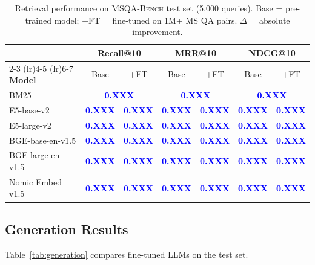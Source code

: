 \documentclass[11pt]{article}
\newcommand{\msqa}{\textsc{MSQA-Bench}}
\newcommand{\placeholder}[1]{\textcolor{blue}{\textbf{#1}}}
\begin{document}
\begin{table}[t]
\centering
\caption{Retrieval performance on \msqa{} test set (5,000 queries). Base =
pre-trained model; +FT = fine-tuned on 1M+ MS QA pairs.
$\Delta$ = absolute improvement.}
\label{tab:retrieval}
\small
\begin{tabular}{@{}l cc cc cc@{}}
\toprule
& \multicolumn{2}{c}{\textbf{Recall@10}} & \multicolumn{2}{c}{\textbf{MRR@10}} & \multicolumn{2}{c}{\textbf{NDCG@10}} \\
\cmidrule(lr){2-3} \cmidrule(lr){4-5} \cmidrule(lr){6-7}
\textbf{Model} & Base & +FT & Base & +FT & Base & +FT \\
\midrule
BM25 & \multicolumn{2}{c}{\placeholder{0.XXX}} & \multicolumn{2}{c}{\placeholder{0.XXX}} & \multicolumn{2}{c}{\placeholder{0.XXX}} \\
\midrule
E5-base-v2         & \placeholder{0.XXX} & \placeholder{0.XXX} & \placeholder{0.XXX} & \placeholder{0.XXX} & \placeholder{0.XXX} & \placeholder{0.XXX} \\
E5-large-v2        & \placeholder{0.XXX} & \placeholder{0.XXX} & \placeholder{0.XXX} & \placeholder{0.XXX} & \placeholder{0.XXX} & \placeholder{0.XXX} \\
BGE-base-en-v1.5   & \placeholder{0.XXX} & \placeholder{0.XXX} & \placeholder{0.XXX} & \placeholder{0.XXX} & \placeholder{0.XXX} & \placeholder{0.XXX} \\
BGE-large-en-v1.5  & \placeholder{0.XXX} & \placeholder{0.XXX} & \placeholder{0.XXX} & \placeholder{0.XXX} & \placeholder{0.XXX} & \placeholder{0.XXX} \\
Nomic Embed v1.5   & \placeholder{0.XXX} & \placeholder{0.XXX} & \placeholder{0.XXX} & \placeholder{0.XXX} & \placeholder{0.XXX} & \placeholder{0.XXX} \\
\bottomrule
\end{tabular}
\end{table}

\subsection{Generation Results}

Table~\ref{tab:generation} compares fine-tuned LLMs on the test set.
\end{document}
